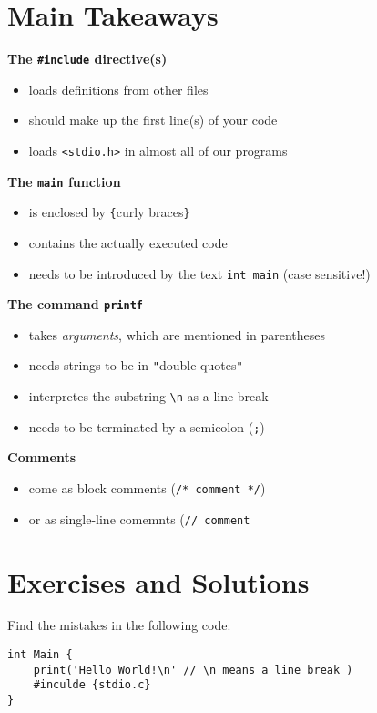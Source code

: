 \section{Main Takeaways}
\begin{defbox}
\textbf{The \texttt{\#include} directive(s)}
\begin{itemize}
\setlength{\itemsep}{0pt}
\item loads definitions from other files
\item should make up the first line(s) of your code
\item loads \texttt{<stdio.h>} in almost all of our programs
\end{itemize}

\textbf{The \texttt{main} function}
\vspace{-6pt}
\begin{itemize}
\setlength{\itemsep}{0pt}
\item is enclosed by \texttt{\{}curly braces\texttt{\}}
\item contains the actually executed code
\item needs to be introduced by the text \texttt{int main} (case sensitive!)
\end{itemize}

\textbf{The command \texttt{printf}}
\vspace{-6pt}
\begin{itemize}
\setlength{\itemsep}{0pt}
\item takes \emph{arguments}, which are mentioned in parentheses
\item needs strings to be in \texttt{"}double quotes\texttt{"}
\item interpretes the substring \texttt{\textbackslash n} as a line break
\item needs to be terminated by a semicolon (\texttt{;})
\end{itemize}

\textbf{Comments}
\begin{itemize}
\vspace{-6pt}
\setlength\itemsep{0pt}
\item come as block comments (\texttt{/* comment */})
\item or as single-line comemnts (\texttt{// comment}
\end{itemize}
\end{defbox}


\section{Exercises and Solutions}
Find the mistakes in the following code:
\begin{codebox}[exo2-1.c]
\begin{verbatim}
int Main {
    print('Hello World!\n' // \n means a line break )
    #inculde {stdio.c}
}
\end{verbatim}
\end{codebox}

